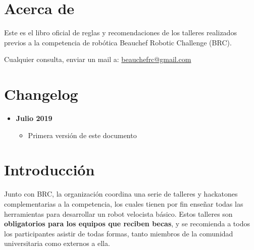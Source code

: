 \section*{Acerca de}
Este es el libro oficial de reglas y recomendaciones de los talleres realizados previos a la competencia de robótica Beauchef Robotic Challenge (BRC).

Cualquier consulta, enviar un mail a: \href{mailto:beauchefrc@gmail.com}{beauchefrc@gmail.com}






\section*{Changelog}

\begin{itemize}
  \item \textbf{Julio 2019}
  \begin{itemize}
    \item Primera versión de este documento
  \end{itemize}
\end{itemize}

\pagebreak

\section{Introducción}

Junto con BRC, la organización coordina una serie de talleres y hackatones complementarias a la competencia, los cuales tienen por fin enseñar todas las herramientas para desarrollar un robot velocista básico. Estos talleres son \textbf{obligatorios para los equipos que reciben becas}, y se recomienda a todos los participantes asistir de todas formas, tanto miembros de la comunidad universitaria como externos a ella. 

